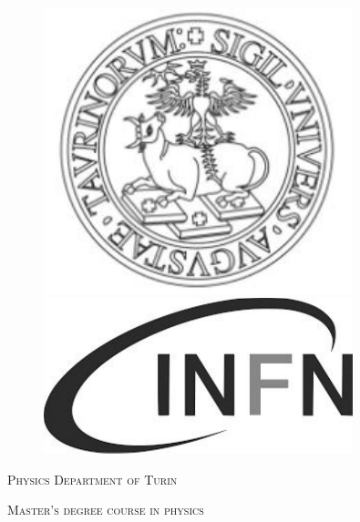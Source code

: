 \documentclass[10pt, a4paper, twoside, onpenany]{report}
\begin{document}
	
	\begin{titlepage}
		\centering
		\begin{figure}[H]
			\centering
			\begin{minipage}{.1\textwidth}
			\end{minipage}
			\begin{minipage}{.4\textwidth}
				\centering
				\includegraphics[width=0.8\textwidth]{img/logo_unito.JPG}
			\end{minipage}
			\begin{minipage}{.4\textwidth}
				\centering
				\includegraphics[width=0.8\textwidth]{img/LOGOINFN.pdf}
			\end{minipage}
			\begin{minipage}{.1\textwidth}
			\end{minipage}
		\end{figure}
		\vspace{1cm}
		{\scshape\LARGE Physics Department of Turin \par}
		{\scshape\LARGE Master's degree course in physics \par}

\end{titlepage}
\end{document}
